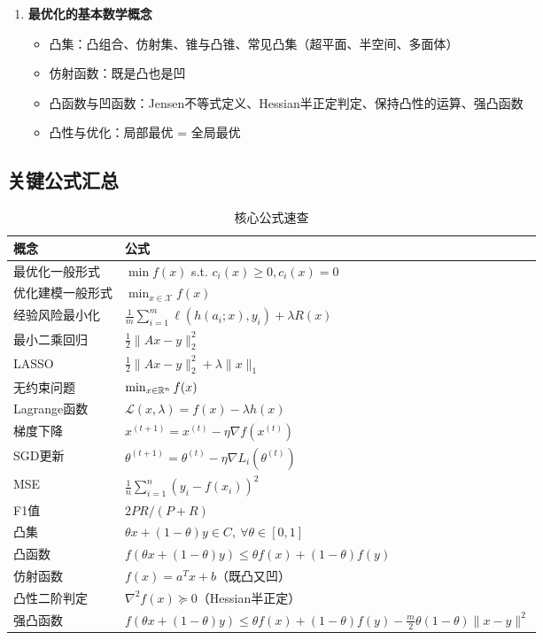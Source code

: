 \begin{conceptbox}[第一章核心内容]
\begin{enumerate}[label=\arabic*., leftmargin=2em]
\begin{itemize}
        \item 其他计算机领域应用
    \end{itemize}
    \item \textbf{最优化的基本数学概念}
    \begin{itemize}
        \item 凸集：凸组合、仿射集、锥与凸锥、常见凸集（超平面、半空间、多面体）
        \item 仿射函数：既是凸也是凹
        \item 凸函数与凹函数：Jensen不等式定义、Hessian半正定判定、保持凸性的运算、强凸函数
        \item 凸性与优化：局部最优 = 全局最优
    \end{itemize}
\end{enumerate}
\end{conceptbox}

\subsection{关键公式汇总}

\begin{table}[htbp]
\centering
\caption{核心公式速查}
\begin{tabular}{@{}ll@{}}
\toprule
\textbf{概念} & \textbf{公式} \\
\midrule
最优化一般形式 & $\min f(x)$ s.t. $c_i(x) \geq 0, c_i(x) = 0$ \\
优化建模一般形式 & $\min_{x\in\mathcal{X}} f(x)$ \\
经验风险最小化 & $\frac{1}{m}\sum_{i=1}^{m}\ell(h(a_i;x),y_i)+\lambda R(x)$ \\
最小二乘回归 & $\frac{1}{2}\|Ax-y\|_2^2$ \\
LASSO & $\frac{1}{2}\|Ax-y\|_2^2+\lambda\|x\|_1$ \\
无约束问题 & $\min_{x \in \mathbb{R}^n} f(x)$ \\
Lagrange函数 & $\mathcal{L}(x, \lambda) = f(x) - \lambda h(x)$ \\
梯度下降 & $x^{(t+1)} = x^{(t)} - \eta \nabla f(x^{(t)})$ \\
SGD更新 & $\theta^{(t+1)} = \theta^{(t)} - \eta \nabla L_i(\theta^{(t)})$ \\
MSE & $\frac{1}{n}\sum_{i=1}^{n}(y_i - f(x_i))^2$ \\
F1值 & $2PR/(P+R)$ \\
凸集 & $\theta x + (1-\theta)y \in C,\ \forall \theta \in [0,1]$ \\
凸函数 & $f(\theta x + (1-\theta)y) \leq \theta f(x) + (1-\theta)f(y)$ \\
仿射函数 & $f(x) = a^T x + b$（既凸又凹） \\
凸性二阶判定 & $\nabla^2 f(x) \succeq 0$（Hessian半正定） \\
强凸函数 & $f(\theta x + (1-\theta)y) \leq \theta f(x) + (1-\theta)f(y) - \frac{m}{2}\theta(1-\theta)\|x-y\|^2$ \\
\bottomrule
\end{tabular}
\end{table}


